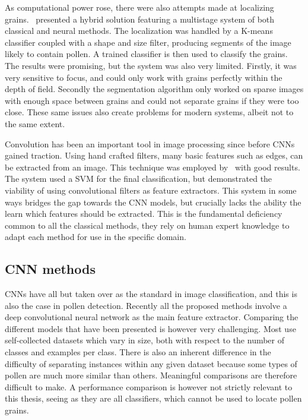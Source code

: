 As computational power rose, there were also attempts made at localizing grains.\ \cite{france_new_2000} presented a hybrid solution featuring a multistage system of both classical and neural methods.
The localization was handled by a K-means classifier coupled with a shape and size filter, producing segments of the image likely to contain pollen.
A trained classifier is then used to classify the grains.
The results were promising, but the system was also very limited.
Firstly, it was very sensitive to focus, and could only work with grains perfectly within the depth of field.
Secondly the segmentation algorithm only worked on sparse images with enough space between grains and could not separate grains if they were too close.
These same issues also create problems for modern systems, albeit not to the same extent.

Convolution has been an important tool in image processing since before CNNs gained traction.
Using hand crafted filters, many basic features such as edges, can be extracted from an image.
This technique was employed by\ \textcite{DaoodICPR16b} with good results.
The system used a SVM for the final classification, but demonstrated the viability of using convolutional filters as feature extractors.
This system in some ways bridges the gap towards the CNN models, but crucially lacks the ability the learn which features should be extracted.
This is the fundamental deficiency common to all the classical methods, they rely on human expert knowledge to adapt each method for use in the specific domain.

\subsection{CNN methods}
CNNs have all but taken over as the standard in image classification, and this is also the case in pollen detection.
Recently all the proposed methods involve a deep convolutional neural network as the main feature extractor.
Comparing the different models that have been presented is however very challenging.
Most use self-collected datasets which vary in size, both with respect to the number of classes and examples per class.
There is also an inherent difference in the difficulty of separating instances within any given dataset because some types of pollen are much more similar than others.
Meaningful comparisons are therefore difficult to make.
A performance comparison is however not strictly relevant to this thesis, seeing as they are all classifiers, which cannot be used to locate pollen grains.

